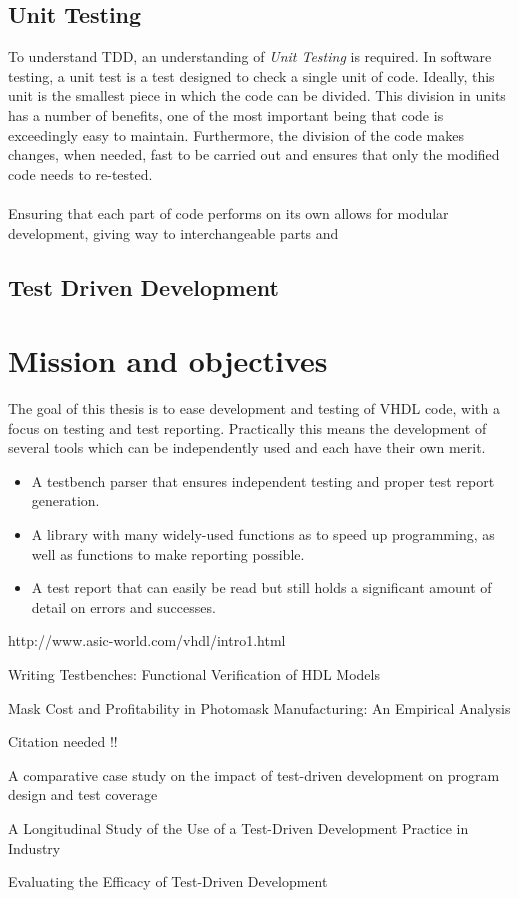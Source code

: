 \documentclass[11pt,british]{article}
\begin{document}
\subsection{Unit Testing}
To understand TDD, an understanding of \emph{Unit Testing} is required. In software testing, a unit test is a test designed to check a single unit of code. Ideally, this unit is the smallest piece in which the code can be divided. This division in units has a number of benefits, one of the most important being that code is exceedingly easy to maintain. Furthermore, the division of the code makes changes, when needed, fast to be carried out and ensures that only the modified code needs to re-tested.
\\
\\
Ensuring that each part of code performs on its own allows for modular development, giving way to interchangeable parts and 
\subsection{Test Driven Development}


\section{Mission and objectives}

The goal of this thesis is to ease development and testing of VHDL
code, with a focus on testing and test reporting. Practically this
means the development of several tools which can be independently
used and each have their own merit.
\begin{itemize}
\item A testbench parser that ensures independent testing and proper test
report generation.
\item A library with many widely-used functions as to speed up programming,
as well as functions to make reporting possible.
\item A test report that can easily be read but still holds a significant
amount of detail on errors and successes.\end{itemize}


\pagebreak{}
\begin{thebibliography}{1}
http://www.asic-world.com/vhdl/intro1.html

Writing Testbenches: Functional Verification of HDL
Models

Mask Cost and Profitability in Photomask Manufacturing:
An Empirical Analysis

Citation needed !!

A comparative case study on the impact of test-driven
development on program design and test coverage

A Longitudinal Study of the Use of a Test-Driven Development
Practice in Industry

Evaluating the Efficacy of Test-Driven Development

\end{thebibliography}
\end{document}
